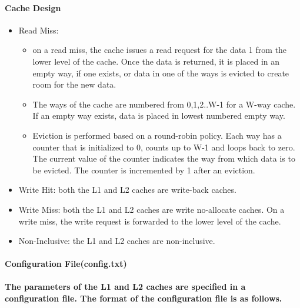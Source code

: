 \documentclass{article}
\begin{document}
 \paragraph{Cache Design}

 \begin{itemize}
     \item Read Miss: \begin{itemize}
         \item on a read miss, the cache issues a read
          request for the data 1 from the lower level of 
          the cache. Once the data is returned, it is placed in
           an empty way, if one exists, or data in one of the ways 
           is evicted to create room for the new data. 

         \item The ways of the cache are numbered from 
        0,1,2..W-1 for a W-way cache. If an empty way exists,
         data is placed in lowest numbered empty way.

         \item  Eviction is performed based on a round-robin 
         policy. Each way has a counter that is initialized to 0,
          counts up to W-1 and loops back to zero. The current value
           of the counter indicates the way from which data is to be evicted. 
           The counter is incremented by 1 after an eviction. 

     \end{itemize}

     \item Write Hit: both the L1 and L2 caches are write-back caches.
     
     \item Write Miss: both the L1 and L2 caches are write no-allocate caches.
      On a write miss, the write request is forwarded to the lower level of the cache. 

      \item Non-Inclusive: the L1 and L2 caches are non-inclusive. 
      
 \end{itemize}


 \paragraph{Configuration File(config.txt)}

 \paragraph{The parameters of the L1 and L2 caches are specified in a 
 configuration file. The format of the configuration file is as follows.
 }
  
\end{document}
